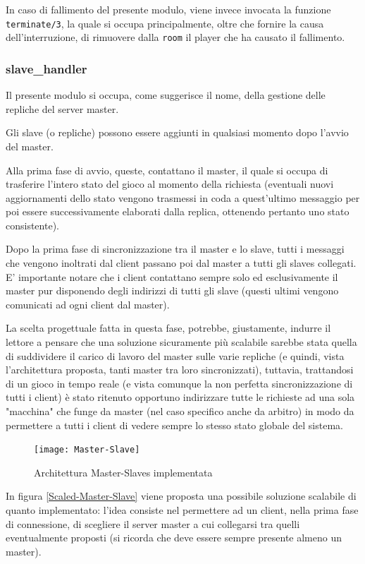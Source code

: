 \documentclass[paper=a4, fontsize=11pt]{scrartcl} %
\numberwithin{equation}{section} %
\numberwithin{figure}{section} %
\numberwithin{table}{section} %
\begin{document}
In caso di fallimento del presente modulo, viene invece invocata la funzione \texttt{terminate/3}, la quale si occupa principalmente, oltre che fornire la causa dell'interruzione, di rimuovere dalla \texttt{room} il player che ha causato il fallimento.
\subsubsection{slave\_handler}
Il presente modulo si occupa, come suggerisce il nome, della gestione delle repliche del server master.

Gli slave (o repliche) possono essere aggiunti in qualsiasi momento dopo l'avvio del master.

Alla prima fase di avvio, queste, contattano il master, il quale si occupa di trasferire l'intero stato del gioco al momento della richiesta (eventuali nuovi aggiornamenti dello stato vengono trasmessi in coda a quest'ultimo messaggio per poi essere successivamente elaborati dalla replica, ottenendo pertanto uno stato consistente).

Dopo la prima fase di sincronizzazione tra il master e lo slave, tutti i messaggi che vengono inoltrati dal client passano poi dal master a tutti gli slaves collegati. E' importante notare che i client contattano sempre solo ed esclusivamente il master pur disponendo degli indirizzi di tutti gli slave (questi ultimi vengono comunicati ad ogni client dal master).

La scelta progettuale fatta in questa fase, potrebbe, giustamente, indurre il lettore a pensare che una soluzione sicuramente più scalabile sarebbe stata quella di suddividere il carico di lavoro del master sulle varie repliche (e quindi, vista l'architettura proposta, tanti master tra loro sincronizzati), tuttavia, trattandosi di un gioco in tempo reale (e vista comunque la non perfetta sincronizzazione di tutti i client) è stato ritenuto opportuno indirizzare tutte le richieste ad una sola "macchina" che funge da master (nel caso specifico anche da arbitro) in modo da permettere a tutti i client di vedere sempre lo stesso stato globale del sistema.



\begin{figure}
\centering
\texttt{[image: Master-Slave]}
\caption{Architettura Master-Slaves implementata}
\label{Master-Slave}
\end{figure}

In figura \ref{Scaled-Master-Slave} viene proposta una possibile soluzione scalabile di quanto implementato: l'idea consiste nel permettere ad un client, nella prima fase di connessione, di scegliere il server master a cui collegarsi tra quelli eventualmente proposti (si ricorda che deve essere sempre presente almeno un master).
\end{document}
